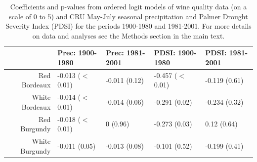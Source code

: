 \documentclass[12pt]{article}
\begin{document}
\begin{table}
\centering
\caption{Coefficients and p-values from  ordered logit models of wine quality data (on a scale of 0 to 5) and CRU May-July seasonal precipitation and Palmer Drought Severity Index (PDSI) for the periods 1900-1980 and 1981-2001. For more details on data and analyses see the Methods section in the main text.} 
\begin{tabular}{||r||l|l||l|l||}
  \hline
 & Prec: 1900-1980 & Prec: 1981-2001 & PDSI: 1900-1980 & PDSI: 1981-2001 \\ 
  \hline
Red Bordeaux & -0.013 ($<$0.01) & -0.011 (0.12) & -0.457 ($<$0.01) & -0.119 (0.61) \\ 
  White Bordeaux & -0.014 ($<$0.01) & -0.014 (0.06) & -0.291 (0.02) & -0.234 (0.32) \\ 
  Red Burgundy & -0.018 ($<$0.01) & 0 (0.96) & -0.273 (0.03) & 0.12 (0.64) \\ 
  White Burgundy & -0.011 (0.05) & -0.013 (0.08) & -0.101 (0.52) & -0.199 (0.41) \\ 
   \hline
\end{tabular}
\end{table}

\pagebreak

\renewcommand{\figurename}{Supplementary Figure}
\setcounter{figure}{0}
\end{document}
